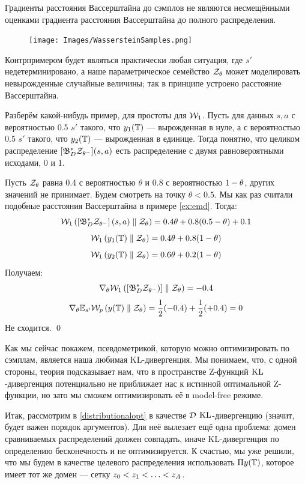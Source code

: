 \begin{theoremBox}[label=th:wassersteingradientsproblem]{}
Градиенты расстояния Вассерштайна до сэмплов не являются несмещёнными оценками градиента расстояния Вассерштайна до полного распределения.

\begin{figure}
\vspace{-0.3cm}
\centering
\texttt{[image: Images/WassersteinSamples.png]}
\vspace{-0.6cm}
\end{figure}
\beginproof[Контрпример]
Контрпримером будет являться практически любая ситуация, где $s'$ недетерминировано, а наше параметрическое семейство $\mathcal{Z}_{\theta}$ может моделировать невырожденные случайные величины; так в принципе устроено расстояние Вассерштайна.

Разберём какой-нибудь пример, для простоты для $\mathcal{W}_1$. Пусть для данных $s, a$ с вероятностью 0.5 $s'$ такого, что $y_1(\mathbb{T})$ --- вырожденная в нуле, а с вероятностью 0.5 $s'$ такого, что $y_2(\mathbb{T})$ --- вырожденная в единице. Тогда понятно, что целиком распределение $[\mathfrak{B}^*_D \mathcal{Z}_{\theta^-}](s, a)$ есть распределение с двумя равновероятными исходами, 0 и 1. 

Пусть $\mathcal{Z}_{\theta}$ равна 0.4 с вероятностью $\theta$ и 0.8 с вероятностью $1 \HM- \theta$, других значений не принимает. Будем смотреть на точку $\theta < 0.5$. Мы как раз считали подобные расстояния Вассерштайна в примере \ref{ex:emd}. Тогда:
$$\mathcal{W}_1 \left( \left[ \mathfrak{B}^*_D \mathcal{Z}_{\theta^-} \right] (s, a) \parallel \mathcal{Z}_{\theta} \right) = 0.4\theta + 0.8(0.5 - \theta) + 0.1$$
$$\mathcal{W}_1 \left( y_1(\mathbb{T}) \parallel \mathcal{Z}_{\theta} \right) = 0.4 \theta + 0.8 (1 - \theta)$$
$$\mathcal{W}_1 \left( y_2(\mathbb{T}) \parallel \mathcal{Z}_{\theta} \right) = 0.6 \theta + 0.2 (1 - \theta)$$
Получаем:
$$\nabla_\theta \mathcal{W}_1 \left( [\mathfrak{B}^*_D \mathcal{Z}_{\theta^-})] \parallel \mathcal{Z}_{\theta} \right) = -0.4$$
$$\nabla_\theta \mathbb{E}_{s'} \mathcal{W}_p \left( y(\mathbb{T}) \parallel \mathcal{Z}_{\theta} \right) = \frac{1}{2} (-0.4) + \frac{1}{2} (+0.4) = 0$$
Не сходится. \qed
\end{theoremBox}

Как мы сейчас покажем, псевдометрикой, которую можно оптимизировать по сэмплам, является наша любимая KL-дивергенция. Мы понимаем, что, с одной стороны, теория подсказывает нам, что в пространстве Z-функций $\operatorname{KL}$-дивергенция потенциально не приближает нас к истинной оптимальной Z-функции, но зато мы сможем оптимизировать её в model-free режиме.

Итак, рассмотрим в \eqref{distributionalopt} в качестве $\mathcal{D}$ $\operatorname{KL}$-дивергенцию (значит, будет важен порядок аргументов). Для неё вылезает ещё одна проблема: домен сравниваемых распределений должен совпадать, иначе KL-дивергенция по определению бесконечность и не оптимизируется. К счастью, мы уже решили, что мы будем в качестве целевого распределения использовать $\Pi y(\mathbb{T})$, которое имеет тот же домен --- сетку $z_0 \HM< z_1 \HM< \dots \HM< z_A$. 

